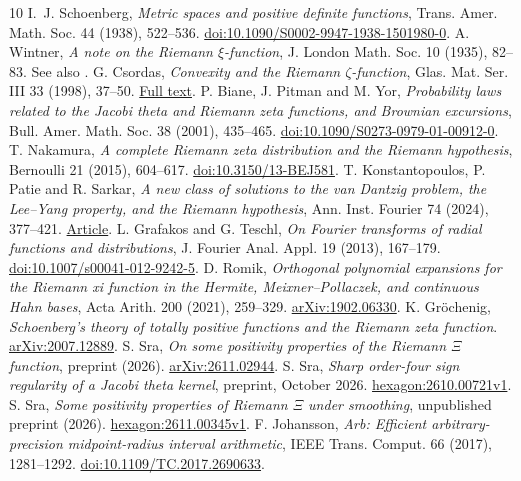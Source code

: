 \documentclass[11pt]{article}
\begin{document}
\begin{thebibliography}{10}
 I.~J. Schoenberg, \emph{Metric spaces and positive
definite functions}, Trans. Amer. Math. Soc. 44 (1938), 522--536.
\href{https://doi.org/10.1090/S0002-9947-1938-1501980-0}{doi:10.1090/S0002-9947-1938-1501980-0}.
 A. Wintner, \emph{A note on the Riemann $\xi$-function},
J. London Math. Soc. 10 (1935), 82--83. See also \cite[Theorem 2.1(v)]{Csordas98}.
 G. Csordas, \emph{Convexity and the Riemann
$\zeta$-function}, Glas. Mat. Ser. III 33 (1998), 37--50.
\href{https://web.math.pmf.unizg.hr/glasnik/33.1/33105.pdf}{Full text}.
 P. Biane, J. Pitman and M. Yor, \emph{Probability laws
related to the Jacobi theta and Riemann zeta functions, and Brownian
excursions}, Bull. Amer. Math. Soc. 38 (2001), 435--465.
\href{https://doi.org/10.1090/S0273-0979-01-00912-0}{doi:10.1090/S0273-0979-01-00912-0}.
 T. Nakamura, \emph{A complete Riemann zeta
distribution and the Riemann hypothesis}, Bernoulli 21 (2015), 604--617.
\href{https://doi.org/10.3150/13-BEJ581}{doi:10.3150/13-BEJ581}.
 T. Konstantopoulos, P. Patie and R. Sarkar,
\emph{A new class of solutions to the van Dantzig problem, the Lee--Yang
property, and the Riemann hypothesis}, Ann. Inst. Fourier 74 (2024), 377--421.
\href{https://aif.centre-mersenne.org/item/?id=AIF_2024__74_1_377_0}{Article}.
 L. Grafakos and G. Teschl, \emph{On Fourier transforms of
radial functions and distributions}, J. Fourier Anal. Appl. 19 (2013),
167--179. \href{https://doi.org/10.1007/s00041-012-9242-5}{doi:10.1007/s00041-012-9242-5}.
 D. Romik, \emph{Orthogonal polynomial expansions for the
Riemann xi function in the Hermite, Meixner--Pollaczek, and continuous Hahn
bases}, Acta Arith. 200 (2021), 259--329.
\href{https://arxiv.org/abs/1902.06330}{arXiv:1902.06330}.
 K. Gr\"ochenig, \emph{Schoenberg's theory of
totally positive functions and the Riemann zeta function}.
\href{https://arxiv.org/abs/2007.12889}{arXiv:2007.12889}.
 S. Sra, \emph{On some positivity properties of the Riemann
$\Xi$ function}, preprint (2026).
\href{https://arxiv.org/abs/2611.02944}{arXiv:2611.02944}.
 S. Sra, \emph{Sharp order-four sign regularity of a
Jacobi theta kernel}, preprint, October 2026.
\href{https://hexagonmath.org/pdf/2610.00721v1}{hexagon:2610.00721v1}.
 S. Sra, \emph{Some positivity properties of Riemann
$\Xi$ under smoothing}, unpublished preprint (2026).
\href{https://hexagonmath.org/2611.00345v1}{hexagon:2611.00345v1}.
 F. Johansson, \emph{Arb: Efficient arbitrary-precision
midpoint-radius interval arithmetic}, IEEE Trans. Comput. 66 (2017),
1281--1292. \href{https://doi.org/10.1109/TC.2017.2690633}{doi:10.1109/TC.2017.2690633}.
\end{thebibliography}
\end{document}
